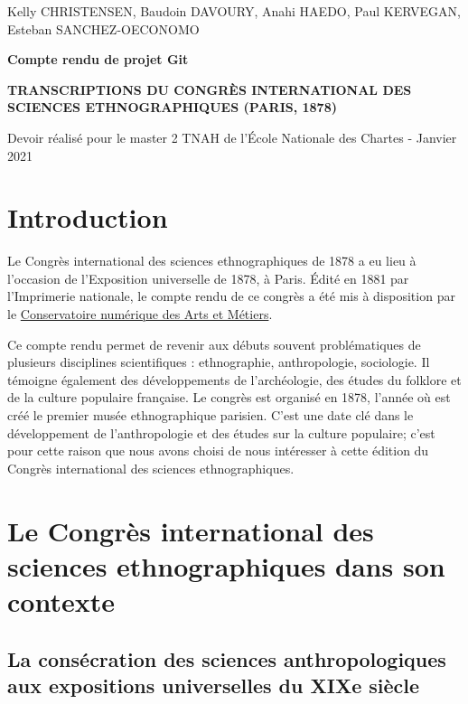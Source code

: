 \documentclass{article}
\begin{document}
	\begin{titlepage}
		\begin{center}
			\large
			Kelly CHRISTENSEN, Baudoin DAVOURY, Anahi HAEDO, Paul KERVEGAN, Esteban SANCHEZ-OECONOMO
			
			\huge
			\vfill
				\textbf{Compte rendu de projet Git}
			
				\textbf{TRANSCRIPTIONS DU CONGRÈS INTERNATIONAL DES SCIENCES ETHNOGRAPHIQUES (PARIS, 1878)}
			\vfill
				
			\large	
			\vfill Devoir réalisé pour le master 2 TNAH de l'École Nationale des Chartes - Janvier 2021
		\end{center}
	\end{titlepage}



	\section{Introduction}
	
	Le Congrès international des sciences ethnographiques de 1878 a eu lieu à l'occasion de l'Exposition universelle de 1878, à Paris. Édité en 1881 par l'Imprimerie nationale, le compte rendu de ce congrès a été mis à disposition par le \href{http://cnum.cnam.fr/CGI/redir.cgi?8XAE243}{Conservatoire numérique des Arts et Métiers}.
	
	Ce compte rendu permet de revenir aux débuts souvent problématiques de plusieurs disciplines scientifiques : ethnographie, anthropologie, sociologie. Il témoigne également des développements de l'archéologie, des études du folklore et de la culture populaire française. Le congrès est organisé en 1878, l'année où est créé le premier musée ethnographique parisien. C'est une date clé dans le développement de l'anthropologie et des études sur la culture populaire; c'est pour cette raison que nous avons choisi de nous intéresser à cette édition du Congrès international des sciences ethnographiques.
	
	
	
	\section{Le Congrès international des sciences ethnographiques dans son contexte}
	
	\subsection{La consécration des sciences anthropologiques aux expositions universelles du XIXe siècle}
	
\end{document}

